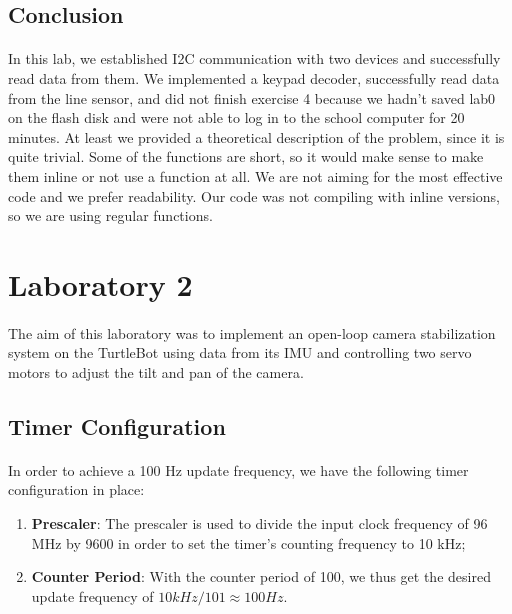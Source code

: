 \documentclass[english]{article}
\begin{document}
	\subsection{Conclusion}
	\paragraph{}
	In this lab, we established I2C communication with two devices and successfully read data from them. We implemented a keypad decoder, 
	successfully read data from the line sensor, and did not finish exercise 4 because we hadn't saved lab0 on the flash disk and were not able
	to log in to the school computer for 20 minutes. At least we provided a theoretical description of the problem, since it is quite trivial. Some
	of the functions are short, so it would make sense to make them inline or not use a function at all. We are not aiming for the most effective 
	code and we prefer readability. Our code was not compiling with inline versions, so we are using regular functions.

\section{Laboratory 2}
\paragraph{}
The aim of this laboratory was to implement an open-loop camera stabilization system on the TurtleBot using data from its IMU and controlling two servo motors to adjust the tilt and pan of the camera. 

    \subsection{Timer Configuration}
    \paragraph{}

    In order to achieve a 100 Hz update frequency, we have the following timer configuration in place:
    \begin{enumerate}
        \item \textbf{Prescaler}: The prescaler is used to divide the input clock frequency of 96 MHz by 9600 in order to set the timer's counting frequency to 10 kHz;
        \item \textbf{Counter Period}: With the counter period of 100, we thus get the desired update frequency of $10kHz/101 \approx 100 Hz.$
    \end{enumerate}
\end{document}
